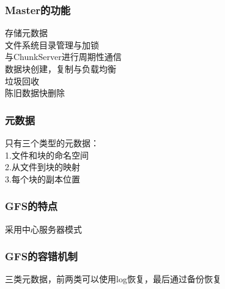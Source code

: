 \documentclass{article}
\begin{document}
\begin{CJK}{UTF8}{gbsn}
	\subsubsection*{Master的功能}
	存储元数据\\
	文件系统目录管理与加锁\\
	与ChunkServer进行周期性通信\\
	数据块创建，复制与负载均衡\\
	垃圾回收\\
	陈旧数据快删除\\
	\subsubsection*{元数据}
	只有三个类型的元数据：\\
	1.文件和块的命名空间\\
	2.从文件到块的映射\\
	3.每个块的副本位置\\
	\subsubsection*{GFS的特点}
	采用中心服务器模式\\
	
	
	\subsubsection*{GFS的容错机制}
	三类元数据，前两类可以使用log恢复，最后通过备份恢复\\
\end{CJK}
\end{document}
